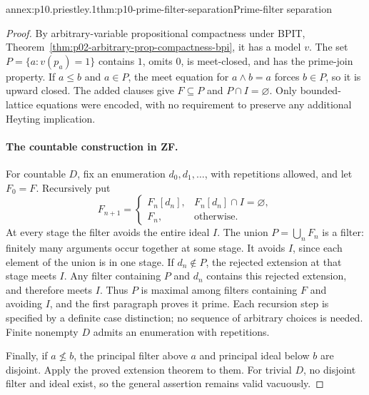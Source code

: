 \begin{annexitem}{annex:p10.priestley.1}{thm:p10-prime-filter-separation}{Prime-filter separation}
\begin{proof}
By arbitrary-variable propositional compactness under BPIT,
Theorem~\ref{thm:p02-arbitrary-prop-compactness-bpi}, it has a model \(v\).
The set \(P=\{a:v(p_a)=1\}\) contains \(1\), omits \(0\),
is meet-closed, and has the prime-join property.
If \(a\leq b\) and \(a\in P\), the meet equation for
\(a\wedge b=a\) forces \(b\in P\), so it is upward closed.
The added clauses give \(F\subseteq P\) and \(P\cap I=\varnothing\).
Only bounded-lattice equations were encoded, with no requirement
to preserve any additional Heyting implication.

\paragraph{The countable construction in ZF.}
For countable \(D\), fix an enumeration \(d_0,d_1,\ldots\),
with repetitions allowed, and let \(F_0=F\).
Recursively put
\[
 F_{n+1}=
 \begin{cases}
  F_n[d_n],&F_n[d_n]\cap I=\varnothing,\\
  F_n,&\text{otherwise}.
 \end{cases}
\]
At every stage the filter avoids the entire ideal \(I\).
The union \(P=\bigcup_n F_n\) is a filter: finitely many
arguments occur together at some stage.
It avoids \(I\), since each element of the union is in one stage.
If \(d_n\notin P\), the rejected extension at that stage meets
\(I\). Any filter containing \(P\) and \(d_n\) contains this
rejected extension, and therefore meets \(I\).
Thus \(P\) is maximal among filters containing \(F\) and avoiding
\(I\), and the first paragraph proves it prime.
Each recursion step is specified by a definite case distinction;
no sequence of arbitrary choices is needed.
Finite nonempty \(D\) admits an enumeration with repetitions.

Finally, if \(a\not\leq b\), the principal filter above \(a\)
and principal ideal below \(b\) are disjoint.
Apply the proved extension theorem to them.
For trivial \(D\), no disjoint filter and ideal exist, so the
general assertion remains valid vacuously.
\end{proof}
\end{annexitem}


